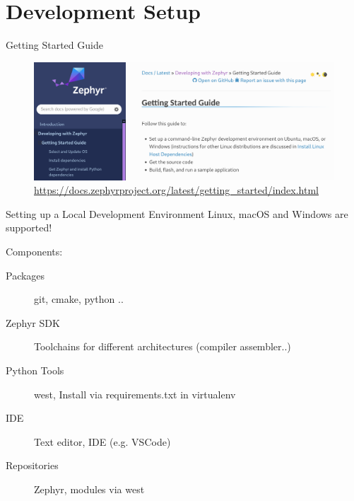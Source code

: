 \documentclass[10pt, aspectratio=169]{beamer}
\begin{document}
\section{Development Setup}
\begin{frame}[fragile]{Getting Started Guide}
  \begin{figure}
    \includegraphics[width=\textwidth]{images/zephyr_getting_started.png}
    \caption*{\scriptsize\href{https://docs.zephyrproject.org/latest/getting_started/index.html}{https://docs.zephyrproject.org/latest/getting\_started/index.html}}
  \end{figure}
\end{frame}
\begin{frame}[fragile]{Setting up a Local Development Environment}
Linux, macOS and Windows are supported!

Components:
  \begin{description}
    \item [Packages] git, cmake, python ..
    \item [Zephyr SDK] Toolchains for different architectures (compiler assembler..)
    \item [Python Tools] west, Install via requirements.txt in virtualenv
    \item [IDE] Text editor, IDE (e.g. VSCode)
    \item [Repositories] Zephyr, modules via west
  \end{description}
\end{frame}
\end{document}
